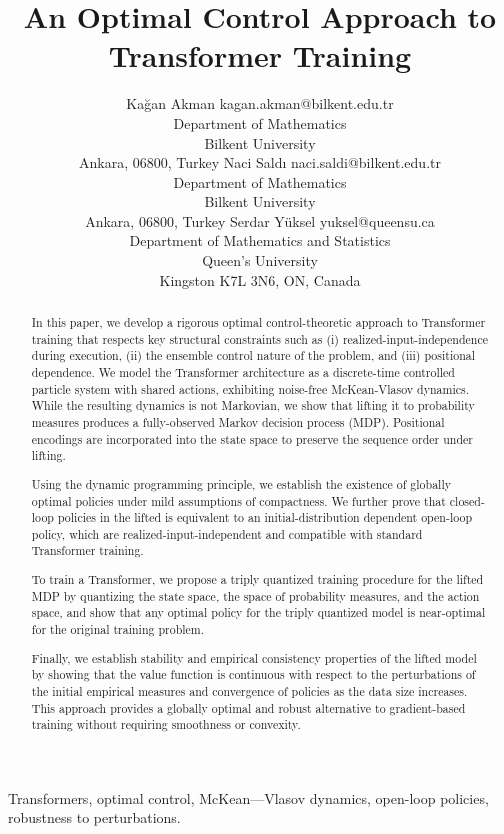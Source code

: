 \documentclass[11pt]{article}
\title{An Optimal Control Approach to Transformer Training}
\author{\name Kağan Akman \email kagan.akman@bilkent.edu.tr \\
       \addr Department of Mathematics\\
       Bilkent University\\
       Ankara, 06800, Turkey
       \AND
       \name Naci Saldı \email naci.saldi@bilkent.edu.tr \\
       \addr Department of Mathematics\\
       Bilkent University\\
       Ankara, 06800, Turkey
       \AND
       \name Serdar Y\"{u}ksel \email yuksel@queensu.ca \\
       \addr Department of Mathematics and Statistics\\Queen's University\\Kingston K7L 3N6, ON, Canada}
\begin{document}
\maketitle

\begin{abstract}%
In this paper, we develop a rigorous optimal control-theoretic approach to Transformer training that respects key structural constraints such as (i) realized-input-independence during execution, (ii) the ensemble control nature of the problem, and (iii) positional dependence. We model the Transformer architecture as a discrete-time controlled particle system with shared actions, exhibiting noise-free McKean-Vlasov dynamics. While the resulting dynamics is not Markovian, we show that lifting it to probability measures produces a fully-observed Markov decision process (MDP). Positional encodings are incorporated into the state space to preserve the sequence order under lifting.

Using the dynamic programming principle, we establish the existence of globally optimal policies under mild assumptions of compactness. We further prove that closed-loop policies in the lifted is equivalent to an initial-distribution dependent open-loop policy, which are realized-input-independent and compatible with standard Transformer training. 

To train a Transformer, we propose a triply quantized training procedure for the lifted MDP by quantizing the state space, the space of probability measures, and the action space, and show that any optimal policy for the triply quantized model is near-optimal for the original training problem. 

Finally, we establish stability and empirical consistency properties of the lifted model by showing that the value function is continuous with respect to the perturbations of the initial empirical measures and convergence of policies as the data size increases. This approach provides a globally optimal and robust alternative to gradient-based training without requiring smoothness or convexity.
\end{abstract}
\begin{keywords}
    Transformers, optimal control, McKean---Vlasov dynamics, open-loop policies, robustness to perturbations.
\end{keywords}
\end{document}
